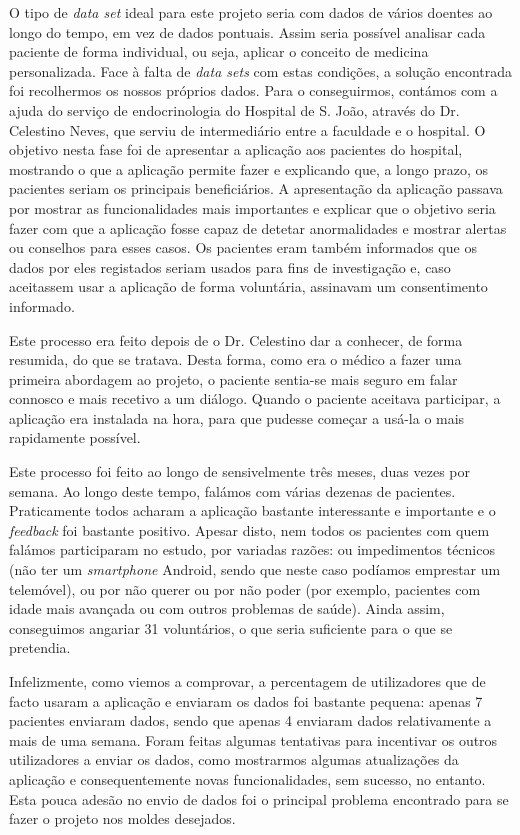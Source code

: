 O tipo de \textit{data set} ideal para este projeto seria com dados de vários doentes ao longo do tempo, em vez de dados pontuais. Assim seria possível analisar cada paciente de forma individual, ou seja, aplicar o conceito de medicina personalizada. Face à falta de \textit{data sets} com estas condições, a solução encontrada foi recolhermos os nossos próprios dados. Para o conseguirmos, contámos com a ajuda do serviço de endocrinologia do Hospital de S. João, através do Dr. Celestino Neves, que serviu de intermediário entre a faculdade e o hospital. O objetivo nesta fase foi de apresentar a aplicação aos pacientes do hospital, mostrando o que a aplicação permite fazer e explicando que, a longo prazo, os pacientes seriam os principais beneficiários. A apresentação da aplicação passava por mostrar as funcionalidades mais importantes e explicar que o objetivo seria fazer com que a aplicação fosse capaz de detetar anormalidades e mostrar alertas ou conselhos para esses casos. Os pacientes eram também informados que os dados por eles registados seriam usados para fins de investigação e, caso aceitassem usar a aplicação de forma voluntária, assinavam um consentimento informado. 

Este processo era feito depois de o Dr. Celestino dar a conhecer, de forma resumida, do que se tratava. Desta forma, como era o médico a fazer uma primeira abordagem ao projeto, o paciente sentia-se mais seguro em falar connosco e mais recetivo a um diálogo. Quando o paciente aceitava participar, a aplicação era instalada na hora, para que pudesse começar a usá-la o mais rapidamente possível. 

Este processo foi feito ao longo de sensivelmente três meses, duas vezes por semana. Ao longo deste tempo, falámos com várias dezenas de pacientes. Praticamente todos acharam a aplicação bastante interessante e importante e o \textit{feedback} foi bastante positivo. Apesar disto, nem todos os pacientes com quem falámos participaram no estudo, por variadas razões: ou impedimentos técnicos (não ter um \textit{smartphone} Android, sendo que neste caso podíamos emprestar um telemóvel), ou por não querer ou por não poder (por exemplo, pacientes com idade mais avançada ou com outros problemas de saúde). Ainda assim, conseguimos angariar 31 voluntários, o que seria suficiente para o que se pretendia. 

Infelizmente, como viemos a comprovar, a percentagem de utilizadores que de facto usaram a aplicação e enviaram os dados foi bastante pequena: apenas 7 pacientes enviaram dados, sendo que apenas 4 enviaram dados relativamente a mais de uma semana. Foram feitas algumas tentativas para incentivar os outros utilizadores a enviar os dados, como mostrarmos algumas atualizações da aplicação e consequentemente novas funcionalidades, sem sucesso, no entanto. Esta pouca adesão no envio de dados foi o principal problema encontrado para se fazer o projeto nos moldes desejados. 

